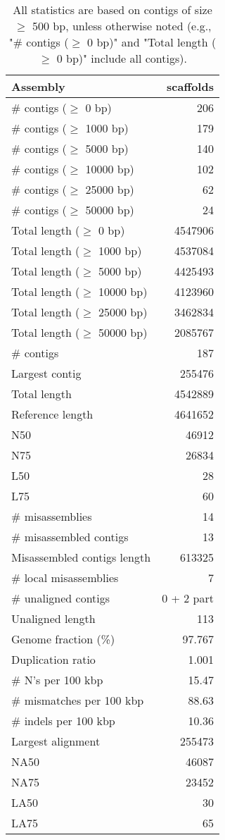 \documentclass[12pt,a4paper]{article}
\begin{document}
\begin{table}[ht]
\begin{center}
\caption{All statistics are based on contigs of size $\geq$ 500 bp, unless otherwise noted (e.g., "\# contigs ($\geq$ 0 bp)" and "Total length ($\geq$ 0 bp)" include all contigs).}
\begin{tabular}{|l*{1}{|r}|}
\hline
Assembly & scaffolds \\ \hline
\# contigs ($\geq$ 0 bp) & 206 \\ \hline
\# contigs ($\geq$ 1000 bp) & 179 \\ \hline
\# contigs ($\geq$ 5000 bp) & 140 \\ \hline
\# contigs ($\geq$ 10000 bp) & 102 \\ \hline
\# contigs ($\geq$ 25000 bp) & 62 \\ \hline
\# contigs ($\geq$ 50000 bp) & 24 \\ \hline
Total length ($\geq$ 0 bp) & 4547906 \\ \hline
Total length ($\geq$ 1000 bp) & 4537084 \\ \hline
Total length ($\geq$ 5000 bp) & 4425493 \\ \hline
Total length ($\geq$ 10000 bp) & 4123960 \\ \hline
Total length ($\geq$ 25000 bp) & 3462834 \\ \hline
Total length ($\geq$ 50000 bp) & 2085767 \\ \hline
\# contigs & 187 \\ \hline
Largest contig & 255476 \\ \hline
Total length & 4542889 \\ \hline
Reference length & 4641652 \\ \hline
N50 & 46912 \\ \hline
N75 & 26834 \\ \hline
L50 & 28 \\ \hline
L75 & 60 \\ \hline
\# misassemblies & 14 \\ \hline
\# misassembled contigs & 13 \\ \hline
Misassembled contigs length & 613325 \\ \hline
\# local misassemblies & 7 \\ \hline
\# unaligned contigs & 0 + 2 part \\ \hline
Unaligned length & 113 \\ \hline
Genome fraction (\%) & 97.767 \\ \hline
Duplication ratio & 1.001 \\ \hline
\# N's per 100 kbp & 15.47 \\ \hline
\# mismatches per 100 kbp & 88.63 \\ \hline
\# indels per 100 kbp & 10.36 \\ \hline
Largest alignment & 255473 \\ \hline
NA50 & 46087 \\ \hline
NA75 & 23452 \\ \hline
LA50 & 30 \\ \hline
LA75 & 65 \\ \hline
\end{tabular}
\end{center}
\end{table}
\end{document}
